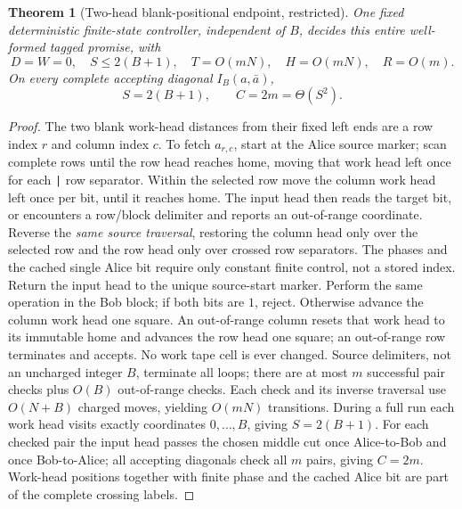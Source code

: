 \documentclass[11pt]{article}
\newtheorem{theorem}{Theorem}
\begin{document}
\begin{theorem}[Two-head blank-positional endpoint, restricted]
One fixed deterministic finite-state controller, independent of \(B\), decides this entire well-formed tagged promise, with
\[
D=W=0,\quad S\le2(B+1),\quad
T=O(mN),\quad H=O(mN),\quad R=O(m).
\]
On every complete accepting diagonal \(I_B(a,\bar a)\),
\[
S=2(B+1),\qquad C=2m=\Theta(S^2).
\]
\end{theorem}
\begin{proof}
The two blank work-head distances from their fixed left ends are a row index \(r\) and column index \(c\). To fetch \(a_{r,c}\), start at the Alice source marker; scan complete rows until the row head reaches home, moving that work head left once for each \texttt{|} row separator. Within the selected row move the column work head left once per bit, until it reaches home. The input head then reads the target bit, or encounters a row/block delimiter and reports an out-of-range coordinate. Reverse the \emph{same source traversal}, restoring the column head only over the selected row and the row head only over crossed row separators. The phases and the cached single Alice bit require only constant finite control, not a stored index. Return the input head to the unique source-start marker. Perform the same operation in the Bob block; if both bits are \(1\), reject. Otherwise advance the column work head one square. An out-of-range column resets that work head to its immutable home and advances the row head one square; an out-of-range row terminates and accepts. No work tape cell is ever changed. Source delimiters, not an uncharged integer \(B\), terminate all loops; there are at most \(m\) successful pair checks plus \(O(B)\) out-of-range checks. Each check and its inverse traversal use \(O(N+B)\) charged moves, yielding \(O(mN)\) transitions. During a full run each work head visits exactly coordinates \(0,\dots,B\), giving \(S=2(B+1)\). For each checked pair the input head passes the chosen middle cut once Alice-to-Bob and once Bob-to-Alice; all accepting diagonals check all \(m\) pairs, giving \(C=2m\). Work-head positions together with finite phase and the cached Alice bit are part of the complete crossing labels.
\end{proof}
\end{document}
